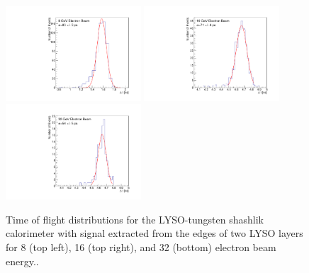 \begin{figure}[H] \centering
\includegraphics[width=0.45\textwidth]{figs/timing/TOF_ShashlikSideReadout_Electron_8GeV} 
\includegraphics[width=0.45\textwidth]{figs/timing/TOF_ShashlikSideReadout_Electron_16GeV} \\
\includegraphics[width=0.45\textwidth]{figs/timing/TOF_ShashlikSideReadout_Electron_32GeV} 
\caption{ Time of flight distributions for the LYSO-tungsten shashlik calorimeter
with signal extracted from the edges of two LYSO layers 
for 8 \GeV (top left), 16 \GeV (top right), and 32 \GeV (bottom) electron beam energy.. } 
\label{fig:ShashlikSideReadoutTOF}
\end{figure}


